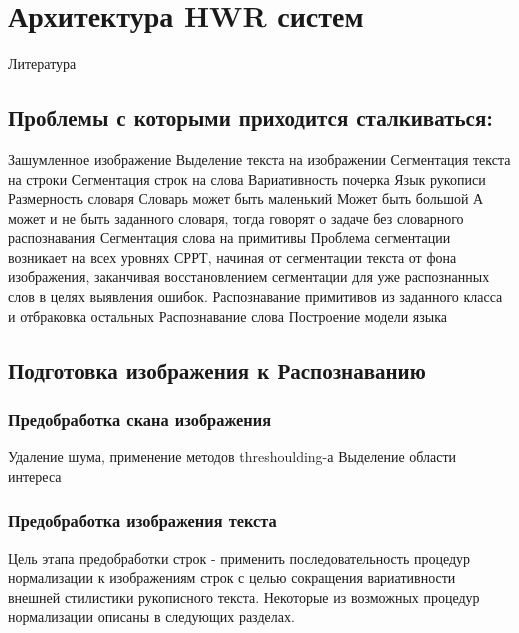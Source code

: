 \chapter{Архитектура HWR систем} \label{chapt4}

Литература \cite{cheriet2007character, romero2012multimodal, bunke2007off}

\section{Проблемы с которыми приходится сталкиваться:} \label{sect4_1}

Зашумленное изображение
Выделение текста на изображении
Сегментация текста на строки
Сегментация строк на слова
Вариативность почерка
Язык рукописи
Размерность словаря
Словарь может быть маленький
Может быть большой
А может и не быть заданного словаря, тогда говорят о задаче без словарного распознавания 
Сегментация слова на примитивы
Проблема сегментации возникает на всех уровнях СРРТ, начиная от сегментации текста от фона изображения, заканчивая восстановлением сегментации для уже распознанных слов в целях выявления ошибок.
Распознавание примитивов из заданного класса и отбраковка остальных
Распознавание слова
Построение модели языка


\section{Подготовка изображения к Распознаванию} \label{sect4_2}

\subsection{Предобработка скана изображения} \label{subsect4_2_1}

\cite{durebrandt2015segmentation}

Удаление шума, применение методов threshoulding-а
Выделение области интереса


\subsection{Предобработка изображения текста} \label{subsect4_2_2}

Цель этапа предобработки строк - применить последовательность процедур нормализации к изображениям строк с целью сокращения вариативности внешней стилистики рукописного текста. Некоторые из возможных процедур нормализации описаны в следующих разделах.

